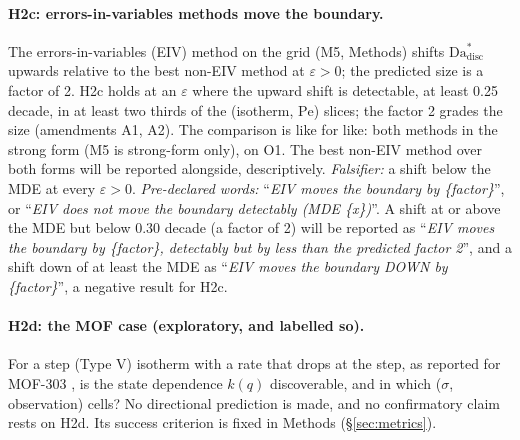 \documentclass[11pt]{article}
\newcommand{\Da}{\mathrm{Da}}
\newcommand{\Pe}{\mathrm{Pe}}
\newcommand{\verdict}[1]{``\textit{#1}''}
\begin{document}
\paragraph{H2c: errors-in-variables methods move the boundary.}
The errors-in-variables (EIV) method on the grid (M5, Methods) shifts
$\Da^{*}_{\mathrm{disc}}$ upwards relative to the best non-EIV method at $\varepsilon > 0$;
the predicted size is a factor of 2. H2c holds at an $\varepsilon$ where the upward shift is
detectable, at least 0.25 decade, in at least two thirds of the (isotherm, $\Pe$) slices;
the factor 2 grades the size (amendments A1, A2). The comparison is like for like: both methods in the strong form (M5 is
strong-form only), on O1. The best non-EIV method over both forms will be reported
alongside, descriptively.
\emph{Falsifier:} a shift below the MDE at every $\varepsilon > 0$.
\emph{Pre-declared words:} \verdict{EIV moves the boundary by \{factor\}}, or
\verdict{EIV does not move the boundary detectably (MDE \{x\})}. A shift at or above the
MDE but below 0.30 decade (a factor of 2) will be reported as \verdict{EIV moves the
boundary by \{factor\}, detectably but by less than the predicted factor 2}, and a shift
down of at least the MDE as \verdict{EIV moves the boundary DOWN by \{factor\}}, a
negative result for H2c.

\paragraph{H2d: the MOF case (exploratory, and labelled so).}
For a step (Type V) isotherm with a rate that drops at the step, as reported for MOF-303
\citep{abuelmaaty2024}, is the state dependence $k(q)$ discoverable, and in which
($\sigma$, observation) cells? No directional prediction is made, and no confirmatory claim
rests on H2d. Its success criterion is fixed in Methods (\S\ref{sec:metrics}).
\end{document}
